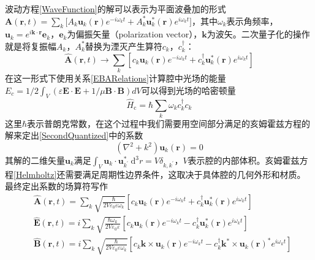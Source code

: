 波动方程\eqref{WaveFunction}的解可以表示为平面波叠加的形式$\mathbf{A}(\mathbf{r}, t) = \sum_{k} \big[A_{k} \mathbf{u}_{k}(\mathbf{r}) e^{-i \omega_{k} t}+ A_{k}^* \mathbf{u}_{k}^*(\mathbf{r}) e^{i \omega_{k} t}\big]$，其中$\omega_{k}$表示角频率，$\mathbf{u}_{k}=e^{i \mathbf{k} \cdot  \mathbf{r}}\mathbf{e}_{k}$，$\mathbf{e}_{k}$为偏振矢量（polarization vector），$\mathbf{k}$为波矢\ChangeNotation。二次量子化的操作就是将复振幅$A_{k}$，$A_{k}^*$替换为湮灭产生算符$c_{k}$，$c_{k}^{\dag}$：
\begin{equation}
\hat{\mathbf{A}}(\mathbf{r}, t)\rightarrow\sum_{k} \left[c_{k} \mathbf{u}_{k}(\mathbf{r}) e^{-i \omega_{k} t}+ c_{k}^{\dag} \mathbf{u}_{k}^*(\mathbf{r}) e^{i \omega_{k} t}\right] 
\label{SecondQuantized}
\end{equation}
在这一形式下使用关系\eqref{EBARelations}计算腔中光场的能量$E_c=1/2 \int_{V}\left(\varepsilon \mathbf{E} \cdot \mathbf{E}+1/\mu \mathbf{B} \cdot \mathbf{B}\right) d V$可以得到光场的哈密顿量\ChangeNotation\cite{gerry2005introductory}
\begin{equation}
\hat{H}_{\mathrm{c}} = \hbar \sum_{k} \omega_{k} c_{k}^{\dag} c_{k}
\label{CavityHamiltonian}
\end{equation}
这里$\hbar$表示普朗克常数，在这个过程中我们需要用空间部分满足的亥姆霍兹方程的解来定出\eqref{SecondQuantized}中的系数\ChangeNotation\cite{reviewCavityMagnonics}
\begin{equation}
\left(\nabla^{2}+k^{2}\right) \mathbf{u}_{k}(\mathbf{r})=0
\label{Helmholtz}
\end{equation}
其解的二维矢量$\mathbf{u}_{k}$满足$\int_{V} \mathbf{u}_{k} \cdot \mathbf{u}_{k^{\prime}}^{*} \mathrm{~d}^{3} r=V \delta_{k, k^{\prime}}$，$V$表示腔的内部体积。亥姆霍兹方程\eqref{Helmholtz}还需要满足周期性边界条件，这取决于具体腔的几何外形和材质。最终定出系数的场算符写作
\begin{align}
&\hat{\mathbf{A}}(\mathbf{r}, t)= \sum_{k} \sqrt{\frac{\hbar}{2 V \varepsilon_{0} \varepsilon \omega_{k}}} \left[ c_{k} \mathbf{u}_{k}(\mathbf{r}) e^{-i \omega_{k} t} + c_{k}^{\dag} \mathbf{u}_{k}^{*} (\mathbf{r}) e^{i \omega_{k} t} \right] \\
&\hat{\mathbf{E}}(\mathbf{r}, t)=i \sum_{k} \sqrt{\frac{\hbar \omega_{k}}{2 V \varepsilon_{0} \varepsilon}} \left[ c_{k} \mathbf{u}_{k}(\mathbf{r}) e^{-i \omega_{k} t} - c_{k}^{\dag} \mathbf{u}_{k}^{*} (\mathbf{r}) e^{i \omega_{k} t} \right] \\
&\hat{\mathbf{B}}(\mathbf{r}, t)=i \sum_{k} \sqrt{\frac{\hbar}{2 V \varepsilon_{0} \varepsilon \omega_{k}}} \left[ c_{k} \mathbf{k} \times \mathbf{u}_{k}(\mathbf{r}) e^{-i \omega_{k} t} - c_{k}^{\dag} \mathbf{k}^* \times \mathbf{u}_{k}(\mathbf{r})^* e^{i \omega_{k} t} \right]
\label{BOperator}
\end{align}

